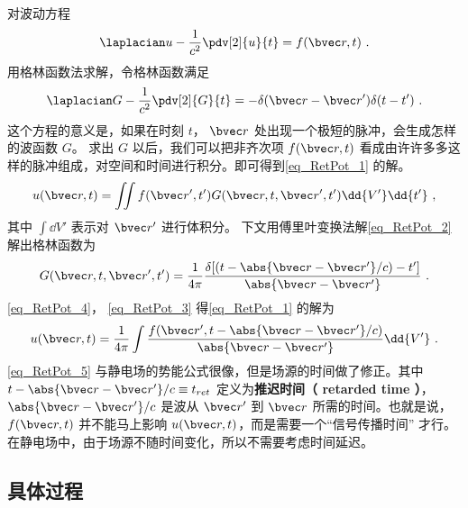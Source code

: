 
\begin{issues}
\issueDraft
\end{issues}


对波动方程
\begin{equation}\label{eq_RetPot_1}
\laplacian u  - \frac{1}{c^2} \pdv[2]{u}{t} = f(\bvec r, t)~.
\end{equation} 
用格林函数法求解，令格林函数满足
\begin{equation}\label{eq_RetPot_2}
\laplacian G - \frac{1}{c^2} \pdv[2]{G}{t} =  - \delta (\bvec r - \bvec r')\delta (t - t')~.
\end{equation} 
这个方程的意义是，如果在时刻 $t$， $\bvec r$ 处出现一个极短的脉冲，会生成怎样的波函数 $G$。 求出 $G$ 以后，我们可以把非齐次项 $f(\bvec r, t)$ 看成由许许多多这样的脉冲组成，对空间和时间进行积分。即可得到\autoref{eq_RetPot_1} 的解。
\begin{equation}\label{eq_RetPot_3}
u(\bvec r, t) = \iint f(\bvec r', t')G(\bvec r,t, \bvec r',t') \dd{V'} \dd{t'} ~,
\end{equation} 
其中 $\int \dd{V'}$ 表示对 $\bvec r'$ 进行体积分。 下文用傅里叶变换法解\autoref{eq_RetPot_2} 解出格林函数为
\begin{equation}\label{eq_RetPot_4}
G(\bvec r, t, \bvec r', t') = \frac{1}{4\pi} \frac{\delta [(t - \abs{\bvec r - \bvec r'}/c) - t']}{\abs{\bvec r - \bvec r'}}~.
\end{equation} 
\autoref{eq_RetPot_4}， \autoref{eq_RetPot_3} 得\autoref{eq_RetPot_1} 的解为
\begin{equation}\label{eq_RetPot_5}
u(\bvec r, t) = \frac{1}{4\pi } \int \frac{f(\bvec r',t - \abs{\bvec r - \bvec r'}/c)}{\abs{\bvec r - \bvec r'}} \dd{V'}~.
\end{equation} 
\autoref{eq_RetPot_5} 与静电场的势能公式很像，但是场源的时间做了修正。其中 $t - \abs{\bvec r - \bvec r'}/c \equiv t_{ret}$ 定义为\textbf{推迟时间（ retarded time ）}， $\abs{\bvec r - \bvec r'}/c$ 是波从 $\bvec r'$ 到 $\bvec r$ 所需的时间。也就是说，$f(\bvec r, t)$ 并不能马上影响 $u(\bvec r, t)$，而是需要一个“信号传播时间” 才行。在静电场中，由于场源不随时间变化，所以不需要考虑时间延迟。

\subsection{具体过程}

